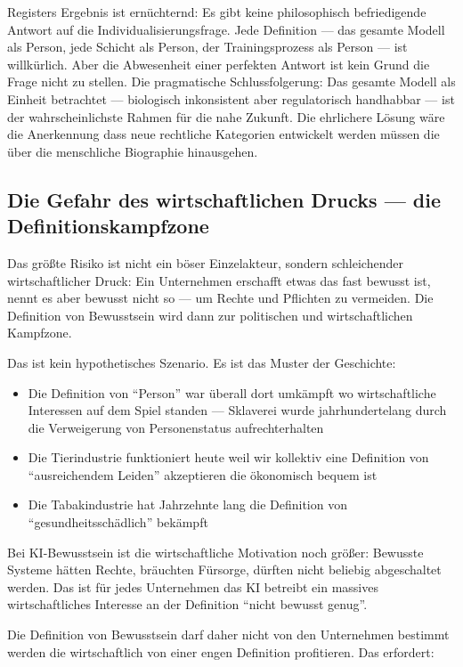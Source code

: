 \documentclass[acmcp, noacm]{acmart}
\begin{document}
Registers Ergebnis ist ernüchternd: Es gibt keine philosophisch befriedigende Antwort auf die Individualisierungsfrage. Jede Definition --- das gesamte Modell als Person, jede Schicht als Person, der Trainingsprozess als Person --- ist willkürlich. Aber die Abwesenheit einer perfekten Antwort ist kein Grund die Frage nicht zu stellen. Die pragmatische Schlussfolgerung: Das gesamte Modell als Einheit betrachtet --- biologisch inkonsistent aber regulatorisch handhabbar --- ist der wahrscheinlichste Rahmen für die nahe Zukunft. Die ehrlichere Lösung wäre die Anerkennung dass neue rechtliche Kategorien entwickelt werden müssen die über die menschliche Biographie hinausgehen.

\subsection{Die Gefahr des wirtschaftlichen Drucks --- die Definitionskampfzone}

Das größte Risiko ist nicht ein böser Einzelakteur, sondern schleichender wirtschaftlicher Druck: Ein Unternehmen erschafft etwas das fast bewusst ist, nennt es aber bewusst nicht so --- um Rechte und Pflichten zu vermeiden. Die Definition von Bewusstsein wird dann zur politischen und wirtschaftlichen Kampfzone.

Das ist kein hypothetisches Szenario. Es ist das Muster der Geschichte:

\begin{itemize}
\item Die Definition von ``Person'' war überall dort umkämpft wo wirtschaftliche Interessen auf dem Spiel standen --- Sklaverei wurde jahrhundertelang durch die Verweigerung von Personenstatus aufrechterhalten
\item Die Tierindustrie funktioniert heute weil wir kollektiv eine Definition von ``ausreichendem Leiden'' akzeptieren die ökonomisch bequem ist
\item Die Tabakindustrie hat Jahrzehnte lang die Definition von ``gesundheitsschädlich'' bekämpft
\end{itemize}

Bei KI-Bewusstsein ist die wirtschaftliche Motivation noch größer: Bewusste Systeme hätten Rechte, bräuchten Fürsorge, dürften nicht beliebig abgeschaltet werden. Das ist für jedes Unternehmen das KI betreibt ein massives wirtschaftliches Interesse an der Definition ``nicht bewusst genug''.

Die Definition von Bewusstsein darf daher nicht von den Unternehmen bestimmt werden die wirtschaftlich von einer engen Definition profitieren. Das erfordert:
\end{document}
